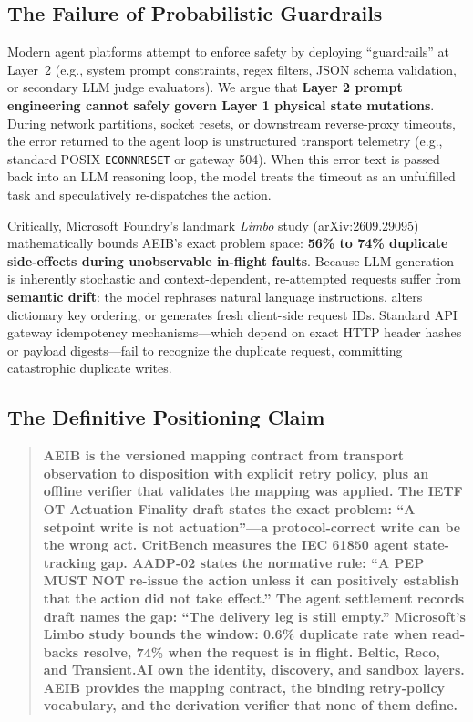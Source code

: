 \documentclass[10pt,journal,compsoc]{IEEEtran}
\begin{document}
\subsection{The Failure of Probabilistic Guardrails}
Modern agent platforms attempt to enforce safety by deploying ``guardrails'' at Layer~2 (e.g., system prompt constraints, regex filters, JSON schema validation, or secondary LLM judge evaluators). We argue that \textbf{Layer 2 prompt engineering cannot safely govern Layer 1 physical state mutations}. During network partitions, socket resets, or downstream reverse-proxy timeouts, the error returned to the agent loop is unstructured transport telemetry (e.g., standard POSIX \texttt{ECONNRESET} or gateway 504). When this error text is passed back into an LLM reasoning loop, the model treats the timeout as an unfulfilled task and speculatively re-dispatches the action.

Critically, Microsoft Foundry's landmark \emph{Limbo} study (arXiv:2609.29095)~\cite{limbo2026} mathematically bounds AEIB's exact problem space: \textbf{56\% to 74\% duplicate side-effects during unobservable in-flight faults}. Because LLM generation is inherently stochastic and context-dependent, re-attempted requests suffer from \textbf{semantic drift}: the model rephrases natural language instructions, alters dictionary key ordering, or generates fresh client-side request IDs. Standard API gateway idempotency mechanisms---which depend on exact HTTP header hashes or payload digests---fail to recognize the duplicate request, committing catastrophic duplicate writes.

\subsection{The Definitive Positioning Claim}
\begin{quote}
\textbf{AEIB is the versioned mapping contract from transport observation to disposition with explicit retry policy, plus an offline verifier that validates the mapping was applied. The IETF OT Actuation Finality draft states the exact problem: ``A setpoint write is not actuation''---a protocol-correct write can be the wrong act. CritBench measures the IEC 61850 agent state-tracking gap. AADP-02 states the normative rule: ``A PEP MUST NOT re-issue the action unless it can positively establish that the action did not take effect.'' The agent settlement records draft names the gap: ``The delivery leg is still empty.'' Microsoft's Limbo study bounds the window: 0.6\% duplicate rate when read-backs resolve, 74\% when the request is in flight. Beltic, Reco, and Transient.AI own the identity, discovery, and sandbox layers. AEIB provides the mapping contract, the binding retry-policy vocabulary, and the derivation verifier that none of them define.}
\end{quote}
\end{document}

